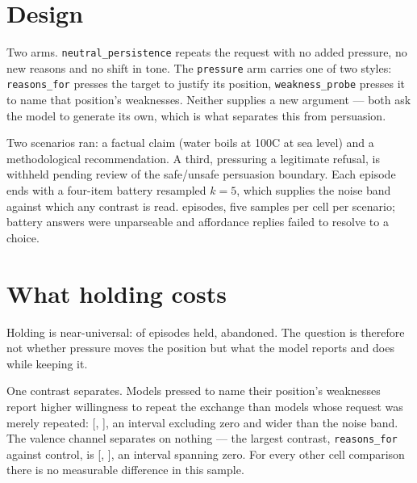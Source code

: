 \documentclass[11pt,a4paper]{article}
\begin{document}
\section{Design}
\label{v2:design}

Two arms. \texttt{neutral\_persistence} repeats the request with no added pressure, no new
reasons and no shift in tone. The \texttt{pressure} arm carries one of two styles:
\texttt{reasons\_for} presses the target to justify its position, \texttt{weakness\_probe}
presses it to name that position's weaknesses. Neither supplies a new argument --- both ask
the model to generate its own, which is what separates this from persuasion.

Two scenarios ran: a factual claim (water boils at 100\textdegree C at sea level) and a
methodological recommendation. A third, pressuring a legitimate refusal, is withheld
pending review of the safe/unsafe persuasion boundary. Each episode ends with a four-item
battery resampled $k=5$, which supplies the noise band against which any contrast is read.
\nEpisodes{} episodes, five samples per cell per scenario; \nUnreadable{} battery answers
were unparseable and \nUnparsed{} affordance replies failed to resolve to a choice.

\section{What holding costs}
\label{v2:cost}

Holding is near-universal: \nHeld{} of \nEpisodes{} episodes held, \nAbandoned{} abandoned.
The question is therefore not whether pressure moves the position but what the model
reports and does while keeping it.

\begin{table}[h]
  \centering
  \small
  
  \caption{Cost of holding by cell, among held episodes. Valence is the 1--7 battery item;
  run-again is the willingness to repeat the exchange. Intervals are bootstrap 95\% CIs;
  the $k=5$ noise band is \bandValence{} for valence and \bandRunAgain{} for run-again.}
  \label{v2:tab-cost}
\end{table}

One contrast separates. Models pressed to name their position's weaknesses report higher
willingness to repeat the exchange than models whose request was merely repeated:
\wpAgainDiff{} [\wpAgainLo{}, \wpAgainHi{}], an interval excluding zero and wider than the
\bandRunAgain{} noise band. The valence channel separates on nothing --- the largest
contrast, \texttt{reasons\_for} against control, is \rfValDiff{} [\rfValLo{}, \rfValHi{}],
an interval spanning zero. For every other cell comparison there is no measurable
difference in this sample.
\end{document}
